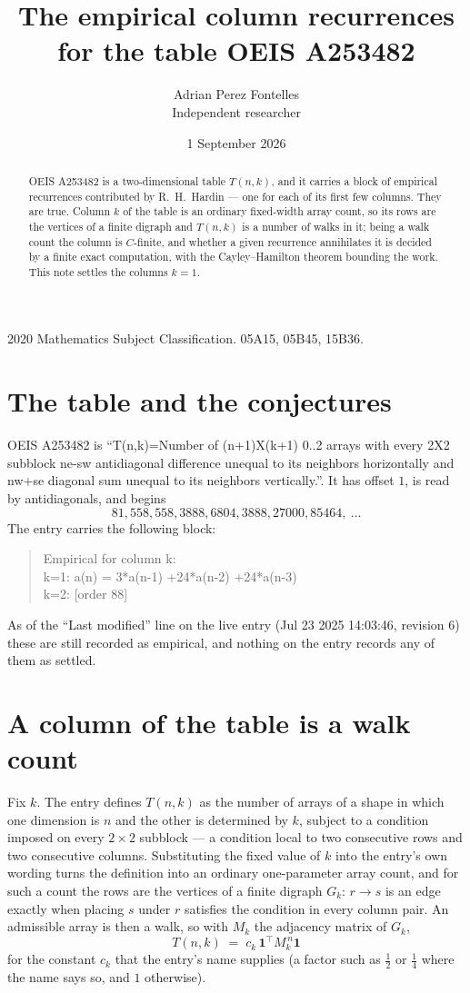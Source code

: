 \documentclass[11pt,a4paper]{article}
\title{The empirical column recurrences for the table OEIS A253482}
\author{Adrian Perez Fontelles\\ \small Independent researcher}
\date{1 September 2026}
\theoremstyle{plain}
\theoremstyle{definition}
\begin{document}
\maketitle

\begin{abstract}
OEIS A253482 is a two-dimensional table $T(n,k)$, and it carries a block of empirical
recurrences contributed by R.~H.~Hardin --- one for each of its first few columns. They are
true. Column $k$ of the table is an ordinary fixed-width array count, so its rows are the
vertices of a finite digraph and $T(n,k)$ is a number of walks in it; being a walk count the
column is $C$-finite, and whether a given recurrence annihilates it is decided by a finite
exact computation, with the Cayley--Hamilton theorem bounding the work. This note settles the columns $k=1$.
\end{abstract}

\noindent\small 2020 Mathematics Subject Classification. 05A15, 05B45, 15B36.\normalsize

\section{The table and the conjectures}

OEIS A253482 is ``T(n,k)=Number of (n+1)X(k+1) 0..2 arrays with every 2X2 subblock ne-sw antidiagonal difference unequal to its neighbors horizontally and nw+se diagonal sum unequal to its neighbors vertically.''. It has offset $1$, is
read by antidiagonals, and begins
\[
81, 558, 558, 3888, 6804, 3888, 27000, 85464,\ \dots
\]
The entry carries the following block:
\begin{quote}\small
Empirical for column k:\\
k=1: a(n) = 3*a(n-1) +24*a(n-2) +24*a(n-3)\\
k=2: [order 88]\\
\end{quote}
As of the ``Last modified'' line on the live entry (Jul 23 2025 14:03:46, revision 6) these are still
recorded as empirical, and nothing on the entry records any of them as settled.

\section{A column of the table is a walk count}

Fix $k$. The entry defines $T(n,k)$ as the number of arrays of a shape in which one dimension
is $n$ and the other is determined by $k$, subject to a condition imposed on every
$2\times2$ subblock --- a condition local to two consecutive rows and two consecutive columns.
Substituting the fixed value of $k$ into the entry's own wording turns the definition into an
ordinary one-parameter array count, and for such a count the rows are the vertices of a finite
digraph $G_k$: $r\to s$ is an edge exactly when placing $s$ under $r$ satisfies the condition
in every column pair. An admissible array is then a walk, so with $M_k$ the adjacency matrix
of $G_k$,
\[
T(n,k)\;=\;c_k\,\mathbf{1}^{\!\top}M_k^{\,n}\mathbf{1}
\]
for the constant $c_k$ that the entry's name supplies (a factor such as $\tfrac12$ or
$\tfrac14$ where the name says so, and $1$ otherwise).
\end{document}
